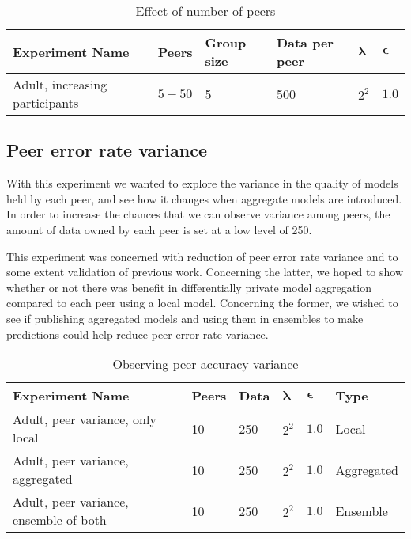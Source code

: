 \begin{table}[h]
	\centering
	\begin{tabular}{|l|l|l|l|l|l|}
		\textbf{Experiment Name}                & \textbf{Peers}      & \textbf{Group size} & \textbf{Data per peer} & $\boldsymbol{\lambda}$ & $\boldsymbol{\epsilon}$ \\
		\hline
		Adult, increasing participants & $5-50$ & 5          & 500  & $2^{2}$   & $1.0$     
	\end{tabular}
	\caption{Effect of number of peers}
	\label{tab:experiments_peer_numbers}
\end{table}

\subsection{Peer error rate variance}
\label{sec:experiment_peer_variance}
With this experiment we wanted to explore the variance in the quality of models held by each peer, and see how it changes when aggregate models are introduced. In order to increase the chances that we can observe variance among peers, the amount of data owned by each peer is set at a low level of 250.

This experiment was concerned with reduction of peer error rate variance and to some extent validation of previous work. Concerning the latter, we hoped to show whether or not there was benefit in differentially private model aggregation compared to each peer using a local model. Concerning the former, we wished to see if publishing aggregated models and using them in ensembles to make predictions could help reduce peer error rate variance.
 
\begin{table}[h]
	\centering
	\begin{tabular}{|l|l|l|l|l|l|}
		{\bf Experiment 	Name}                  & {\bf Peers} & {\bf Data} & $\boldsymbol{\lambda}$ & $\boldsymbol{\epsilon}$ & {\bf Type} \\
		\hline
		Adult, peer variance, only local       & 10          & 250        & $2^{2}$   & $1.0$      & Local      \\
		Adult, peer variance, aggregated       & 10          & 250        & $2^{2}$   & $1.0$      & Aggregated \\
		Adult, peer variance, ensemble of both & 10          & 250        & $2^{2}$   & $1.0$      & Ensemble  
	\end{tabular}
	\caption{Observing peer accuracy variance}
	\label{tab:experiments_peer_variance}
\end{table}

